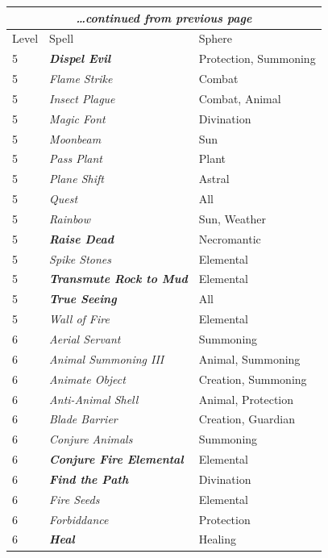 \begin{multicols}{2}
\noindent
\begin{tabular}{|p{}|p{}|p{}|}
\multicolumn{3}{c}{\textit{\ldots continued from previous page}} \\
\hline
Level	& Spell	& Sphere \\
\hline\hline
\rowcolor[gray]{.9}5	& \textbf{\textit{Dispel Evil}}	& Protection, Summoning \\
5	& \textit{Flame Strike}	& Combat \\
\rowcolor[gray]{.9}5	& \textit{Insect Plague}	& Combat, Animal \\
5	& \textit{Magic Font}	& Divination \\
\rowcolor[gray]{.9}5	& \textit{Moonbeam}	& Sun \\
5	& \textit{Pass Plant}	& Plant \\
\rowcolor[gray]{.9}5	& \textit{Plane Shift}	& Astral \\
5	& \textit{Quest}	& All \\
\rowcolor[gray]{.9}5	& \textit{Rainbow}	& Sun, Weather \\
5	& \textbf{\textit{Raise Dead}}	& Necromantic \\
\rowcolor[gray]{.9}5	& \textit{Spike Stones} 	& Elemental \\
5	& \textbf{\textit{Transmute Rock to Mud}}	& Elemental \\
\rowcolor[gray]{.9}5	& \textbf{\textit{True Seeing}}	& All \\
5	& \textit{Wall of Fire}	& Elemental \\
\rowcolor[gray]{.9}6	& \textit{Aerial Servant}	& Summoning \\
6	& \textit{Animal Summoning III}	& Animal, Summoning \\
\rowcolor[gray]{.9}6	& \textit{Animate Object}	& Creation, Summoning \\
6	& \textit{Anti-Animal Shell}	& Animal, Protection \\
\rowcolor[gray]{.9}6	& \textit{Blade Barrier}	& Creation, Guardian \\
6	& \textit{Conjure Animals}	& Summoning \\
\rowcolor[gray]{.9}6	& \textbf{\textit{Conjure Fire Elemental}}	& Elemental \\
6	& \textbf{\textit{Find the Path}}	& Divination \\
\rowcolor[gray]{.9}6	& \textit{Fire Seeds}	& Elemental \\
6	& \textit{Forbiddance}	& Protection \\
\rowcolor[gray]{.9}6	& \textbf{\textit{Heal}}	& Healing \\

\end{tabular}
\end{multicols}
